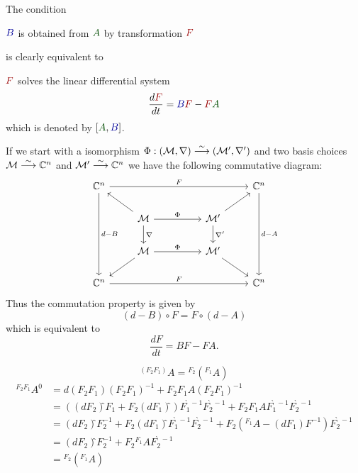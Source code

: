 \begin{rem}
  \def\myB{\textcolor{blue!60!black}{B}}
  \def\myA{\textcolor{green!30!black}{A}}
  \def\myF{\textcolor{red!60!black}{F}}
  The condition
  \begin{einr}
    $\myB$ is obtained from $\myA$ by transformation $\myF$
  \end{einr}
  is clearly equivalent to
  \begin{einr}
    $\myF$ solves the linear differential system
    \[
      \frac{d\myF}{dt}=\myB\myF-\myF\myA
    \]
    which is denoted by $[\myA,\myB]$.
  \end{einr}
  \begin{s-rem}
    If we start with a isomorphism
    $\Phi:(\mathcal{M},\nabla)\overset{\sim}\longrightarrow(\mathcal{M}',\nabla')$ and two
    basis choices $\mathcal{M}\overset{\sim}\longrightarrow\mathbb{C}^n$ and
    $\mathcal{M}'\overset{\sim}\longrightarrow\mathbb{C}^n$ we have the following commutative
    diagram:
    \[ \begin{tikzcd}
        \C^n \arrow{rrrr}{F}\arrow{ddd}{d-B}&&&& \C^n\arrow{ddd}{d-A}
        \\ & \cM \dar{\nabla}\arrow{rr}{\Phi}\ular&& \cM'\dar{\nabla'}\urar
        \\ & \cM \arrow{rr}{\Phi}\dlar&& \cM'\drar
        \\ \C^n \arrow{rrrr}{F}&&&& \C^n
    \end{tikzcd} \]
    Thus the commutation property is given by
    \[
      (d-B)\circ F=F\circ(d-A)
    \]
    which is equivalent \TODO[really] to
    \[
      \frac{dF}{dt}=BF-FA.
    \]
  \end{s-rem}
\end{rem}
\begin{rem}
  \[
    {}^{(F_2F_1)}\!A =
    {}^{F_2}\!\left({}^{F_1}\!A\right)
  \]
  \begin{align*}
    {}^{F_2F_1}\!A^0
    &= d(F_2F_1)(F_2F_1)^{-1}+F_2F_1 A(F_2F_1)^{-1}
  \\&=\left(
      \left(dF_2\right)̂F_1
      +F_2\left(dF_1\right)̂
    \right) F_1^{̀-1} F_2^{̀-1}
    +F_2F_1 A F_1^{̀-1}F_2^{̀-1}
  \\&= \left(dF_2\right)̂F_2^{-1}
     +F_2\left(dF_1\right)̂ F_1^{̀-1} F_2^{̀-1}
     +F_2
     \left(
       {}^{F_1}\!A-\left(dF_1\right)F^{-1}
     \right)
     F_2^{̀-1}
  \\&= \left(dF_2\right)̂F_2^{-1} +F_2 {}^{F_1}\!A F_2^{̀-1}
  \\&= {}^{F_2}\!\left({}^{F_1}\!A\right)
  \end{align*}
\end{rem}

